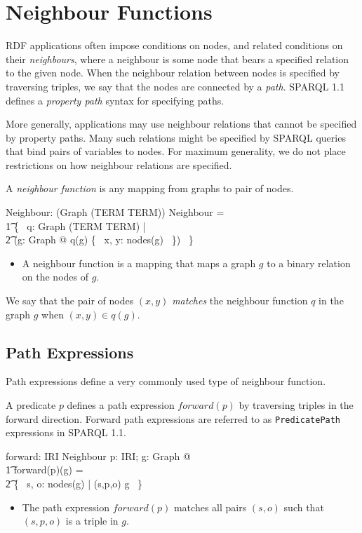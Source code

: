 \documentclass{article}
\begin{document}
\section{Neighbour Functions}
\label{sec-neighbours}

RDF applications often impose conditions on nodes, and related conditions on their {\em neighbours},
where a neighbour is some node that bears a specified relation to the given node.
When the neighbour relation between nodes is specified by traversing triples, we say that the nodes
are connected by a {\em path}. 
SPARQL 1.1\cite{w3c:sparql11} defines a {\em property path} syntax for specifying paths. 

More generally, applications may use neighbour relations that cannot be specified by property paths.
Many such relations might be specified by SPARQL queries that bind pairs of variables to nodes.
For maximum generality, we do not place restrictions on how neighbour relations are specified.

A {\em neighbour function} is any mapping from graphs to pair of nodes.
\begin{axdef}
	Neighbour: \power (Graph \fun (TERM \rel TERM))
\where
	Neighbour = \\
\t1		\{~ q: Graph \fun (TERM \rel TERM) | \\
\t2			(\forall g: Graph @ q(g) \subseteq \{~ x, y: nodes(g) ~\}) ~\}
\end{axdef}
\begin{itemize}
\item A neighbour function is a mapping that maps a graph $g$ to a binary relation on the nodes of $g$.
\end{itemize}

We say that the pair of nodes $(x,y)$ {\em matches} the neighbour function $q$ in the graph $g$ when $(x,y) \in q(g)$.

\subsection{Path Expressions}

Path expressions define a very commonly used type of neighbour function.

A predicate $p$ defines a path expression $forward(p)$ by traversing triples in the forward direction.
Forward path expressions are referred to as {\tt PredicatePath} expressions in SPARQL 1.1.
\begin{axdef}
	forward: IRI \fun Neighbour
\where
	\forall p: IRI; g: Graph @ \\
\t1		forward(p)(g) = \\
\t2			\{~ s, o: nodes(g) | (s,p,o) \in g ~\}
\end{axdef}
\begin{itemize}
\item The path expression $forward(p)$ matches all pairs $(s,o)$ such that $(s,p,o)$ is a triple in $g$.
\end{itemize}
\end{document}
